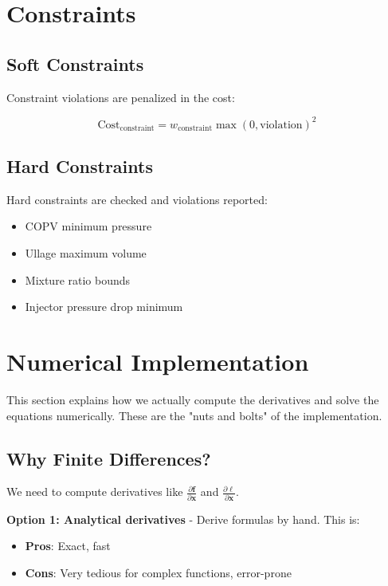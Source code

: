 \documentclass[11pt,a4paper]{article}
\begin{document}
\section{Constraints}

\subsection{Soft Constraints}

Constraint violations are penalized in the cost:

\begin{equation}
\text{Cost}_{\text{constraint}} = w_{\text{constraint}} \max(0, \text{violation})^2
\end{equation}

\subsection{Hard Constraints}

Hard constraints are checked and violations reported:
\begin{itemize}
    \item COPV minimum pressure
    \item Ullage maximum volume
    \item Mixture ratio bounds
    \item Injector pressure drop minimum
\end{itemize}

\section{Numerical Implementation}

This section explains how we actually compute the derivatives and solve the equations numerically. These are the "nuts and bolts" of the implementation.

\subsection{Why Finite Differences?}

We need to compute derivatives like $\frac{\partial \mathbf{f}}{\partial \mathbf{x}}$ and $\frac{\partial \ell}{\partial \mathbf{x}}$. 

\textbf{Option 1: Analytical derivatives} - Derive formulas by hand. This is:
\begin{itemize}
    \item \textbf{Pros}: Exact, fast
    \item \textbf{Cons}: Very tedious for complex functions, error-prone
\end{itemize}
\end{document}
